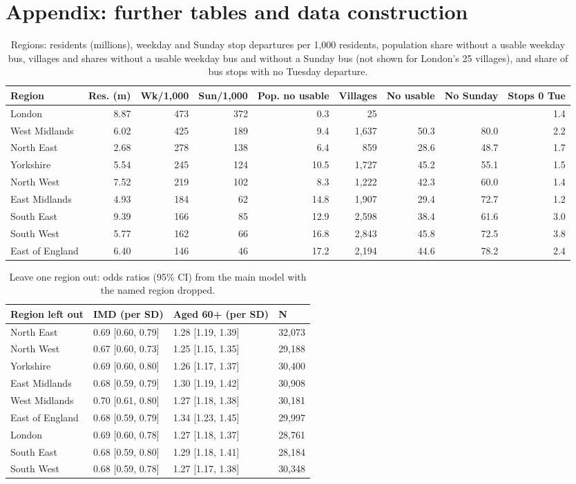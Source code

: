 \documentclass[11pt,a4paper]{article}
\begin{document}
\section{Appendix: further tables and data construction}
\begin{table}[htbp]\centering\footnotesize\caption{Regions: residents (millions), weekday and Sunday stop departures per 1,000 residents, population share without a usable weekday bus, villages and shares without a usable weekday bus and without a Sunday bus (not shown for London's 25 villages), and share of bus stops with no Tuesday departure.}\label{tab:regions}\begin{tabular}{lrrrrrrrr}\toprule Region & Res. (m) & Wk/1,000 & Sun/1,000 & Pop. no usable & Villages & No usable & No Sunday & Stops 0 Tue\\\midrule
London & 8.87 & 473 & 372 & 0.3 & 25 &  &  & 1.4\\
West Midlands & 6.02 & 425 & 189 & 9.4 & 1,637 & 50.3 & 80.0 & 2.2\\
North East & 2.68 & 278 & 138 & 6.4 & 859 & 28.6 & 48.7 & 1.7\\
Yorkshire & 5.54 & 245 & 124 & 10.5 & 1,727 & 45.2 & 55.1 & 1.5\\
North West & 7.52 & 219 & 102 & 8.3 & 1,222 & 42.3 & 60.0 & 1.4\\
East Midlands & 4.93 & 184 & 62 & 14.8 & 1,907 & 29.4 & 72.7 & 1.2\\
South East & 9.39 & 166 & 85 & 12.9 & 2,598 & 38.4 & 61.6 & 3.0\\
South West & 5.77 & 162 & 66 & 16.8 & 2,843 & 45.8 & 72.5 & 3.8\\
East of England & 6.40 & 146 & 46 & 17.2 & 2,194 & 44.6 & 78.2 & 2.4\\
\bottomrule\end{tabular}\end{table}
\begin{table}[htbp]\centering\small\caption{Leave one region out: odds ratios (95\% CI) from the main model with the named region dropped.}\label{tab:loo}\begin{tabular}{llll}\toprule Region left out & IMD (per SD) & Aged 60+ (per SD) & N\\\midrule
North East & 0.69 [0.60, 0.79] & 1.28 [1.19, 1.39] & 32,073\\
North West & 0.67 [0.60, 0.73] & 1.25 [1.15, 1.35] & 29,188\\
Yorkshire & 0.69 [0.60, 0.80] & 1.26 [1.17, 1.37] & 30,400\\
East Midlands & 0.68 [0.59, 0.79] & 1.30 [1.19, 1.42] & 30,908\\
West Midlands & 0.70 [0.61, 0.80] & 1.27 [1.18, 1.38] & 30,181\\
East of England & 0.68 [0.59, 0.79] & 1.34 [1.23, 1.45] & 29,997\\
London & 0.69 [0.60, 0.78] & 1.27 [1.18, 1.37] & 28,761\\
South East & 0.68 [0.59, 0.80] & 1.29 [1.18, 1.41] & 28,184\\
South West & 0.68 [0.59, 0.78] & 1.27 [1.17, 1.38] & 30,348\\
\bottomrule\end{tabular}\end{table}
\end{document}
